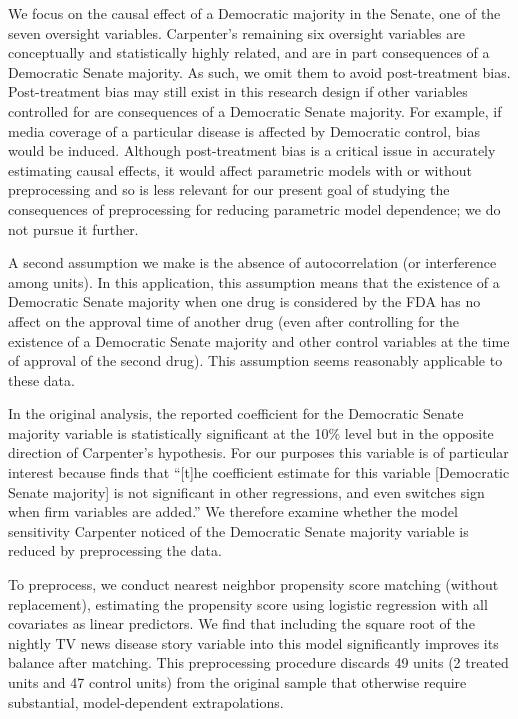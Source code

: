 \documentclass[11pt,titlepage]{article}
\begin{document}
We focus on the causal effect of a Democratic majority in the Senate,
one of the seven oversight variables.  Carpenter's remaining six
oversight variables are conceptually and statistically highly related,
and are in part consequences of a Democratic Senate majority.  As
such, we omit them to avoid post-treatment bias.  Post-treatment bias
may still exist in this research design if other variables controlled
for are consequences of a Democratic Senate majority.  For example, if
media coverage of a particular disease is affected by Democratic
control, bias would be induced.  Although post-treatment bias is a
critical issue in accurately estimating causal effects, it would
affect parametric models with or without preprocessing and so is less
relevant for our present goal of studying the consequences of
preprocessing for reducing parametric model dependence; we do not
pursue it further.

A second assumption we make is the absence of autocorrelation (or
interference among units).  In this application, this assumption means
that the existence of a Democratic Senate majority when one drug is
considered by the FDA has no affect on the approval time of another
drug (even after controlling for the existence of a Democratic Senate
majority and other control variables at the time of approval of the
second drug).  This assumption seems reasonably applicable to these
data.

In the original analysis, the reported coefficient for the Democratic
Senate majority variable is statistically significant at the 10\%
level but in the opposite direction of Carpenter's hypothesis.  For
our purposes this variable is of particular interest because
\citet[p.498]{Carp02} finds that ``[t]he coefficient estimate for this
variable [Democratic Senate majority] is not significant in other
regressions, and even switches sign when firm variables are added.''
We therefore examine whether the model sensitivity Carpenter noticed
of the Democratic Senate majority variable is reduced by preprocessing
the data.

To preprocess, we conduct nearest neighbor propensity score matching
(without replacement), estimating the propensity score using logistic
regression with all covariates as linear predictors. We find that
including the square root of the nightly TV news disease story
variable into this model significantly improves its balance after
matching. This preprocessing procedure discards 49 units (2 treated
units and 47 control units) from the original sample that otherwise
require substantial, model-dependent extrapolations.
\end{document}
